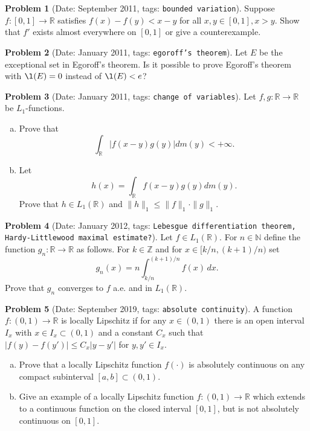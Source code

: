 \documentclass[11pt, notitlepage]{article}
\theoremstyle{definition}
\theoremstyle{definition}
\theoremstyle{definition}
\newtheorem{probstate}{Problem}
\theoremstyle{remark}
\newenvironment{problem}[2]{
    \begin{probstate}[Date: #1, tags: \texttt{#2}]
}
{
  \end{probstate}
}
\newcommand{\R}{\mathbb{R}}
\newcommand{\Z}{\mathbb{Z}}
\newcommand{\N}{\mathbb{N}}
\begin{document}
\begin{problem}{September 2011}{bounded variation}
  Suppose $f:[0,1] \to \R$ satisfies $f(x)-f(y)<x-y$ for all $x,y\in [0,1], x>y$.
  Show that $f'$ exists almost everywhere on $[0,1]$ or give a counterexample.
\end{problem}


\begin{problem}{January 2011}{egoroff's theorem}
  Let $E$ be the exceptional set in Egoroff's theorem.
    Is it possible to prove Egoroff's theorem with
    $\l(E)=0$ instead of $\l(E) < e$?
\end{problem}


\begin{problem}{January 2011}{change of variables}
  Let $f,g: \mathbb R \rightarrow \mathbb R$ be $L_1$-functions.
  \begin{enumerate}[(a)]
\item Prove that
\[
\int_{\mathbb R} |f(x-y)g(y)| dm(y) < +\infty.
\]
  \item Let
\[
h(x)= \int_{\mathbb R} f(x-y)g(y) dm(y).
\]
Prove that $h \in L_1(\mathbb R)$ and $\|h\|_1 \le \|f\|_1 \cdot \|g\|_1$.
\end{enumerate}
\end{problem}

\begin{problem}{January 2012}{Lebesgue differentiation theorem, Hardy-Littlewood maximal estimate?}
  Let  $f \in L_1(\R)$.
  For $n \in \N$ define the function $g_n: \R \to \R$ as follows.  For $k \in \Z$ and for $x \in [k/n,(k+1)/n)$ set
\[
 g_n(x)=n \int_{k/n}^{(k+1)/n} f (x) \, dx.
\]
Prove that $g_n$ converges to $f$ a.e. and in $L_1(\R)$.
\end{problem}


\begin{problem}{September 2019}{absolute continuity}
   A function $f:(0,1)\to\mathbb{R}$ is locally Lipschitz if for   any $x\in(0,1)$ there is an open interval $I_x$ with $x\in I_x\subset (0,1)$ and a constant $C_x$ such that $|f(y)-f(y')|\le C_x|y-y'|$ for $y,y'\in I_x$.

\begin{enumerate}[(a)]
\item Prove that a locally Lipschitz function $f(\cdot)$ is absolutely continuous on any compact subinterval
$[a,b]\subset (0,1)$.

\item  Give an example of a locally Lipschitz function $f:(0,1)\to\mathbb{R}$ which extends to a continuous function on the closed interval $[0,1]$, but is not absolutely continuous on $[0,1]$.
\end{enumerate}
\end{problem}
\end{document}

